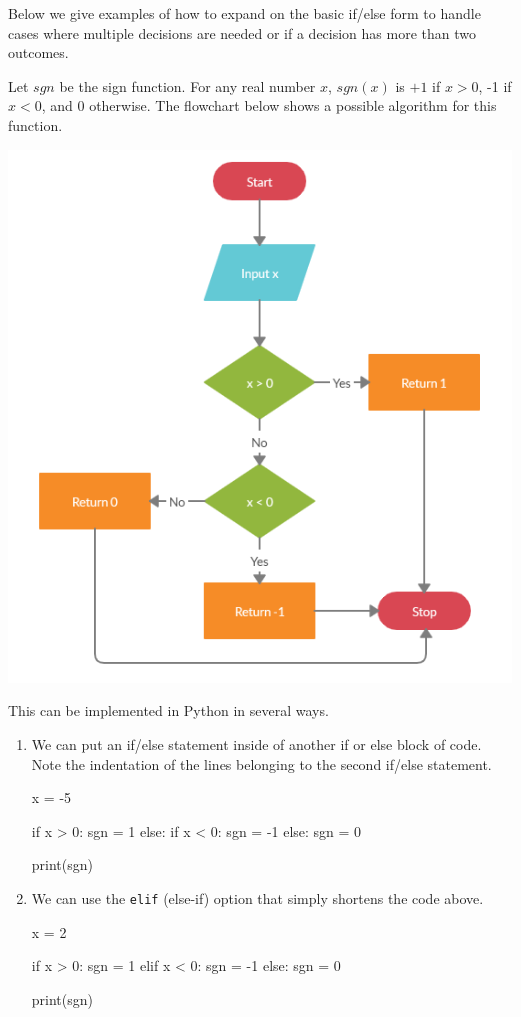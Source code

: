 \documentclass{ximera}
\begin{document}
Below we give examples of how to expand on the basic if/else form to handle cases where multiple decisions are needed or if a decision has more than two outcomes. 

Let $sgn$ be the sign function. For any real number $x$, $sgn(x)$ is $+1$ if $x>0$, -1 if $x<0$, and $0$ otherwise. The flowchart below shows a possible algorithm for this function.

\begin{center}
	\includegraphics{signfun.png}
\end{center}

This can be implemented in Python in several ways. 

\begin{enumerate}
	\item We can put an if/else statement inside of another if or else block of code. Note the indentation of the lines belonging to the second if/else statement.
\begin{sageCell}
x = -5

if x > 0:
	sgn = 1
else:
	if x < 0:
		sgn = -1
	else:
		sgn = 0

print(sgn)
\end{sageCell}
	
	\item We can use the \verb|elif| (else-if) option that simply shortens the code above.
\begin{sageCell}
x = 2
	
if x > 0:
	sgn = 1
elif x < 0:
	sgn = -1
else:
	sgn = 0

print(sgn)
\end{sageCell}
\end{enumerate}
\end{document}
